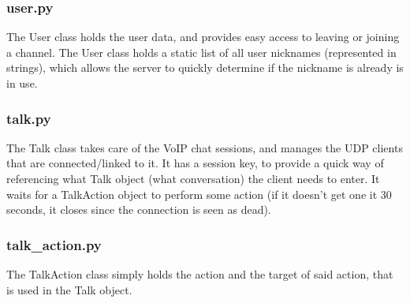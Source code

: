 \documentclass[12pt]{rapport}
\begin{document}
\subsubsection*{user.py}
The User class holds the user data, and provides easy access to
leaving or joining a channel. The User class holds a static list of
all user nicknames (represented in strings), which allows the server
to quickly determine if the nickname is already is in use.

\subsubsection*{talk.py}
The Talk class takes care of the VoIP chat sessions, and manages the
UDP clients that are connected/linked to it. It has a session key, to
provide a quick way of referencing what Talk object (what
conversation) the client needs to enter. It waits for a TalkAction
object to perform some action (if it doesn't get one it 30 seconds, it
closes since the connection is seen as dead).

\subsubsection*{talk\_action.py}
The TalkAction class simply holds the action and the target of said
action, that is used in the Talk object.
\end{document}
